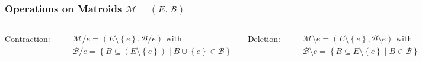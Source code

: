 \documentclass{beamer}
\newcommand{\tupel}[1]{\left(#1\right)}
\newcommand{\set}[1]{\left\{#1\right\}}
\begin{document}
\begin{frame}[fragile]
  \frametitle{Operations on Matroids $\mathcal{M} = \tupel{E, \mathcal{B}}$}
  \begin{columns}
    \begin{center}
      Contraction:
    \end{center}
    \vspace{-0.6cm}
    \begin{align*}
      &\mathcal{M}/e = \tupel{E\setminus\set{e}, \mathcal{B}/e}\text{ with}\\
      &\mathcal{B}/e = \set{B\subseteq (E\setminus\set{e})\middle| B\cup\set{e}\in\mathcal{B}}
    \end{align*}
    \column<4->{0.5\textwidth}
    \begin{center}
      Deletion:
    \end{center}
    \vspace{-0.6cm}
    \begin{align*}
      &\mathcal{M}\setminus e = \tupel{E\setminus\set{e},\mathcal{B}\setminus e}\text{ with}\\
      &\mathcal{B}\setminus e = \set{B\subseteq E\setminus\set{e}\middle|B\in\mathcal{B}}
    \end{align*}
  \end{columns}
  \begin{center}
  \end{center}
\end{frame}
\end{document}
